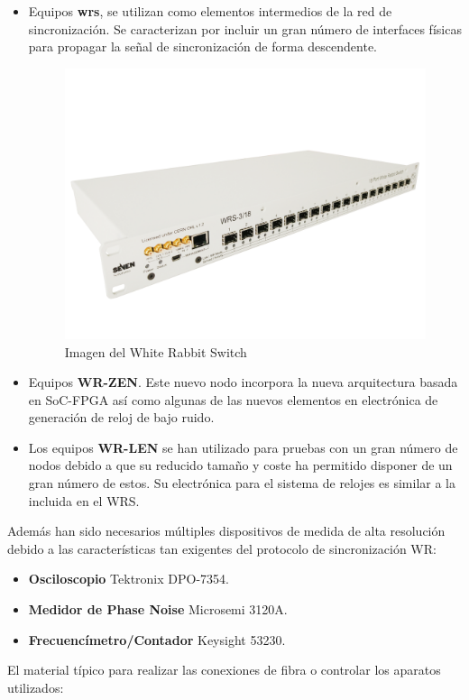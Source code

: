 \begin{itemize}
	\item Equipos \textbf{\gls{wrs}}, se utilizan como elementos intermedios de 
	la 
	red de 
	sincronización. Se caracterizan por incluir un gran número de interfaces 
	físicas para propagar la señal de sincronización de forma descendente.
	\begin{figure}
		\centering
		\includegraphics[width=0.4\linewidth]{imagenes/wrs}
		\caption[Imagen del White Rabbit Switch]{Imagen del White Rabbit Switch}
		\label{fig:wrs}
	\end{figure}
	 
	\item Equipos \textbf{WR-ZEN}. Este nuevo nodo incorpora la nueva 
	arquitectura basada en SoC-FPGA así como algunas de las nuevos elementos en 
	electrónica de generación de reloj de bajo ruido.
	\item Los equipos \textbf{WR-LEN} se han utilizado para pruebas con un gran 
	número de nodos debido a que su reducido tamaño y coste ha permitido 
	disponer de un gran número de estos. Su electrónica para el sistema de 
	relojes es similar a la incluida en el WRS.
\end{itemize}

Además han sido necesarios múltiples dispositivos de medida de alta resolución 
debido a las características tan exigentes del protocolo de sincronización WR:

\begin{itemize}
	\item \textbf{Osciloscopio} Tektronix DPO-7354.
	\item \textbf{Medidor de Phase Noise} Microsemi 3120A.
	\item \textbf{Frecuencímetro/Contador} Keysight 53230.
\end{itemize}

El material típico para realizar las conexiones de fibra o controlar los 
aparatos utilizados:

